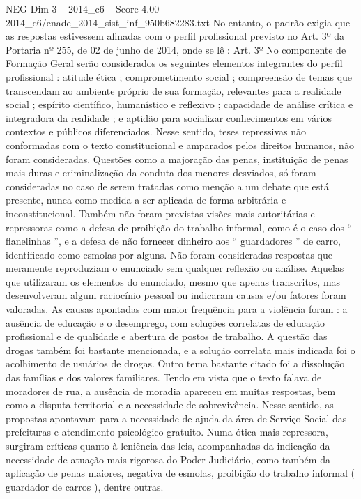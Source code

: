 \begin{textsample}{NEG Dim 3 – 2014\_c6 – Score 4.00 – 2014\_c6/enade\_2014\_sist\_inf\_950b682283.txt}
No entanto, o padrão exigia que as respostas estivessem afinadas com o perfil profissional previsto no Art. 3º da Portaria nº 255, de 02 de junho de 2014, onde se lê : Art. 3º No componente de Formação Geral serão considerados os seguintes elementos integrantes do perfil profissional : atitude ética ; comprometimento social ; compreensão de temas que transcendam ao ambiente próprio de sua formação, relevantes para a realidade social ; espírito científico, humanístico e reflexivo ; capacidade de análise crítica e integradora da realidade ; e aptidão para socializar conhecimentos em vários contextos e públicos diferenciados.
Nesse sentido, teses repressivas não conformadas com o texto constitucional e amparados pelos direitos humanos, não foram consideradas.
Questões como a majoração das penas, instituição de penas mais duras e criminalização da conduta dos menores desviados, só foram consideradas no caso de serem tratadas como menção a um debate que está presente, nunca como medida a ser aplicada de forma arbitrária e inconstitucional.
Também não foram previstas visões mais autoritárias e repressoras como a defesa de proibição do trabalho informal, como é o caso dos “ flanelinhas ”, e a defesa de não fornecer dinheiro aos “ guardadores ” de carro, identificado como esmolas por alguns.
Não foram consideradas respostas que meramente reproduziam o enunciado sem qualquer reflexão ou análise.
Aquelas que utilizaram os elementos do enunciado, mesmo que apenas transcritos, mas desenvolveram algum raciocínio pessoal ou indicaram causas e/ou fatores foram valoradas.
As causas apontadas com maior frequência para a violência foram : a ausência de educação e o desemprego, com soluções correlatas de educação profissional e de qualidade e abertura de postos de trabalho.
A questão das drogas também foi bastante mencionada, e a solução correlata mais indicada foi o acolhimento de usuários de drogas.
Outro tema bastante citado foi a dissolução das famílias e dos valores familiares.
Tendo em vista que o texto falava de moradores de rua, a ausência de moradia apareceu em muitas respostas, bem como a disputa territorial e a necessidade de sobrevivência.
Nesse sentido, as propostas apontavam para a necessidade de ajuda da área de Serviço Social das prefeituras e atendimento psicológico gratuito.
Numa ótica mais repressora, surgiram críticas quanto à leniência das leis, acompanhadas da indicação da necessidade de atuação mais rigorosa do Poder Judiciário, como também da aplicação de penas maiores, negativa de esmolas, proibição do trabalho informal ( guardador de carros ), dentre outras.

\end{textsample}
